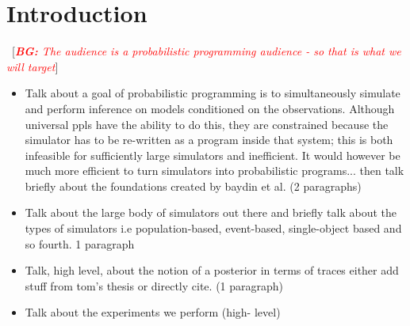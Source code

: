 \documentclass{article}
\newcommand{\bg}[1]{~{{[{\it \textcolor{red}{{\bf BG:} #1}}]}}}
\begin{document}
\begin{abstract}
\end{abstract}

\section{Introduction}
\label{sec:intro}
\bg{The audience is a probabilistic programming audience - so that is what we will target}

\begin{itemize}

\item Talk about a goal of probabilistic programming is to simultaneously simulate and perform inference on models conditioned on the observations. Although universal ppls have the ability to do this, they are constrained because the simulator has to be re-written as a program inside that system; this is both infeasible for sufficiently large simulators and inefficient. It would however be much more efficient to turn simulators into probabilistic programs... then talk briefly about the foundations created by baydin et al. (2 paragraphs)
\item Talk about the large body of simulators out there and briefly talk about the types of simulators
i.e population-based, event-based, single-object based and so fourth. {1 paragraph}
\item Talk, high level, about the notion of a posterior in terms of traces either add stuff from tom's thesis or directly cite. (1 paragraph)
\item Talk about the experiments we perform (high- level)


\end{itemize}
\end{document}
